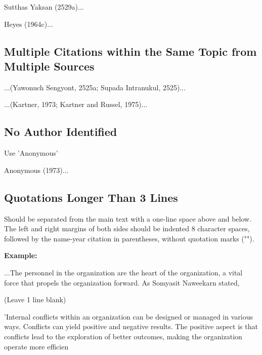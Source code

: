 Sutthas Yaksan (2529a)...

Heyes (1964c)...

\subsection{Multiple Citations within the Same Topic from Multiple Sources}

...(Yawonuch Sengyont, 2525a; Supada Intranukul, 2525)...

...(Kartner, 1973; Kartner and Russel, 1975)...

\subsection{No Author Identified}

Use 'Anonymous'

Anonymous (1973)...

\subsection{Quotations Longer Than 3 Lines}

Should be separated from the main text with a one-line space above and below. The left and right margins of both sides should be indented 8 character spaces, followed by the name-year citation in parentheses, without quotation marks ("").

\textbf{Example:}

...The personnel in the organization are the heart of the organization, a vital force that propels the organization forward. As Somyasit Naweekarn stated,

(Leave 1 line blank)

        'Internal conflicts within an organization can be designed or managed in various
        ways. Conflicts can yield positive and negative results. The positive aspect is that
        conflicts lead to the exploration of better outcomes, making the organization operate
        more efficien